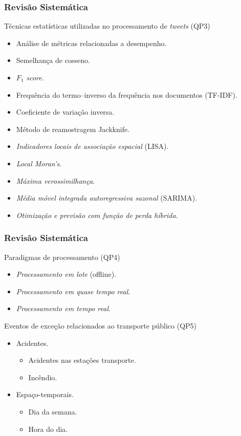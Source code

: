 \documentclass{beamer}
\begin{document}
\begin{frame}
\frametitle{Revisão Sistemática}
\begin{block}{Técnicas estatísticas utilizadas no processamento de \textit{tweets} (QP3)}
\begin{itemize}
\item Análise de métricas relacionadas a desempenho.
\item Semelhança de cosseno.
\item \textit{${F_1}$ score}.
\item Frequência do termo–inverso da frequência nos documentos (TF-IDF).
\item Coeficiente de variação inversa.
\item Método de reamostragem Jackknife.
\item \textit{Indicadores locais de associação espacial} (LISA).
\item \textit{Local Moran's}.
\item \textit{Máxima verossimilhança}.
\item \textit{Média móvel integrada autoregressiva sazonal} (SARIMA).
\item \textit{Otimização e previsão com função de perda híbrida}.
\end{itemize}
\end{block}
\end{frame}
\begin{frame}
\frametitle{Revisão Sistemática}
\begin{block}{Paradigmas de processamento (QP4)}
\begin{itemize}
\item \textit{Processamento em lote} (offline).
\item \textit{Processamento em quase tempo real}.
\item \textit{Processamento em tempo real}.
\end{itemize}
\end{block}

\begin{block}{Eventos de exceção relacionados ao transporte público (QP5)}
\begin{itemize}
\item Acidentes.
\begin{itemize}
\item Acidentes nas estações transporte.
\item Incêndio.
\end{itemize}

\item Espaço-temporais.
\begin{itemize}
\item Dia da semana.
\item Hora do dia.
\end{itemize}

\end{itemize}
\end{block}

\end{frame}
\end{document}
